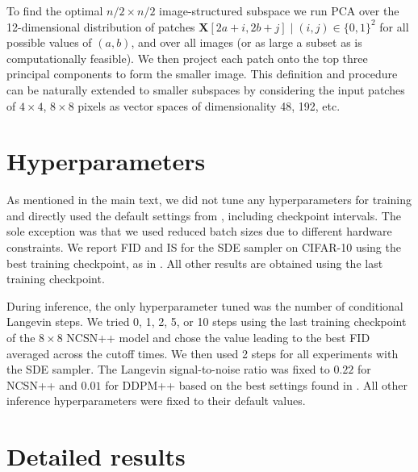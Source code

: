 \documentclass{article}
\begin{document}
To find the optimal $n/2 \times n/2$ image-structured subspace we run PCA over the 12-dimensional distribution of patches $\mathbf{X}[2a+i,2b+j] \mid (i, j) \in \{0,1\}^2$ for all possible values of $(a, b)$, and over all images (or as large a subset as is computationally feasible). We then project each patch onto the top three principal components to form the smaller image. This definition and procedure can be naturally extended to smaller subspaces by considering the input patches of $4\times 4$, $8\times 8$ pixels as vector spaces of dimensionality 48, 192, etc.

\section{Hyperparameters} \label{appendix:hyperparameters}

As mentioned in the main text, we did not tune any hyperparameters for training and directly used the default settings from \cite{song2021score}, including checkpoint intervals. The sole exception was that we used reduced batch sizes due to different hardware constraints. We report FID and IS for the SDE sampler on CIFAR-10 using the best training checkpoint, as in \cite{song2021score}. All other results are obtained using the last training checkpoint.

During inference, the only hyperparameter tuned was the number of conditional Langevin steps. We tried 0, 1, 2, 5, or 10 steps using the last training checkpoint of the $8\times 8$ NCSN++ model and chose the value leading to the best FID averaged across the cutoff times. We then used 2 steps for all experiments with the SDE sampler. The Langevin signal-to-noise ratio was fixed to $0.22$ for NCSN++ and $0.01$ for DDPM++ based on the best settings found in \cite{song2021score}. All other inference hyperparameters were fixed to their default values.

\clearpage
\section{Detailed results} \label{appendix:detailed-results}
\end{document}

